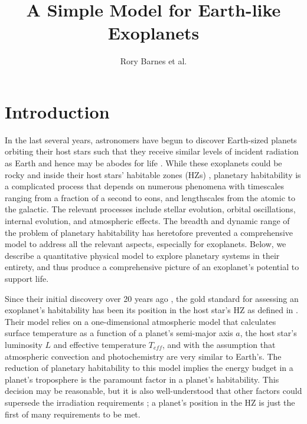 \documentclass[preprint,12pt]{aastex}
\def\eg{{\it e.g.\ }}
\begin{document}
\title{A Simple Model for Earth-like Exoplanets}
\author{Rory Barnes et al.}

\begin{abstract}
\end{abstract}

\section{Introduction\label{sec:intro}}

In the last several years, astronomers have begun to discover
Earth-sized planets orbiting their host stars such that they receive
similar levels of incident radiation as Earth and hence may be abodes
for life
\citep[\eg][]{AngladaEscude12,Borucki13,Torres15,Barnes15_hite,Morton16}. While
these exoplanets could be rocky and inside their host stars' habitable
zones (HZs) \citep{Hart79,Kasting93,Selsis07,Kopparapu13}, planetary
habitability is a complicated process that depends on numerous
phenomena with timescales ranging from a fraction of a second to eons,
and lengthscales from the atomic to the galactic. The relevant
processes include stellar evolution, orbital oscillations, internal
evolution, and atmospheric effects. The breadth and dynamic range of
the problem of planetary habitability has heretofore prevented a
comprehensive model to address all the relevant aspects, especially
for exoplanets. Below, we describe a quantitative physical model to
explore planetary systems in their entirety, and thus produce a
comprehensive picture of an exoplanet's potential to support life.

Since their initial discovery over 20 years ago
\citep{MayorQueloz95}, the gold standard for assessing
an exoplanet's habitability has been its position in the host star's
HZ as defined in \cite{Kasting93}. Their model relies on a
one-dimensional atmospheric model that calculates surface temperature
as a function of a planet's semi-major axis $a$, the host star's
luminosity $L$ and effective temperature $T_{eff}$, and with the
assumption that atmospheric convection and photochemistry are very
similar to Earth's. The reduction of planetary habitability to this
model implies the energy budget in a planet's troposphere is the
paramount factor in a planet's habitability. This decision may be
reasonable, but it is also well-understood that other factors could
supersede the irradiation requirements
\citep[\eg][]{Joshi97,Segura03,Barnes08,Segura10,Spiegel10,LugerBarnes15,DriscollBarnes15}; a
planet's position in the HZ is just the first of many requirements to
be met.
\end{document}
